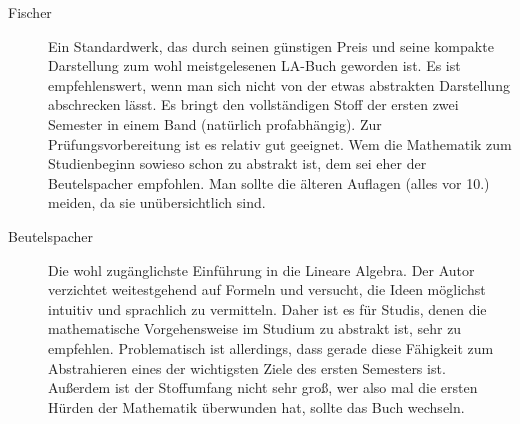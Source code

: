 \begin{description}
\item[Fischer]{
Ein Standardwerk, das durch seinen günstigen Preis und seine kompakte
Darstellung zum wohl meistgelesenen LA-Buch geworden ist. Es ist
empfehlenswert, wenn man sich nicht von der etwas abstrakten Darstellung
abschrecken lässt. Es bringt den vollständigen Stoff der ersten zwei
Semester in einem Band (natürlich profabhängig). Zur
Prüfungsvorbereitung
ist es relativ gut geeignet. Wem die Mathematik zum Studienbeginn
sowieso
schon zu abstrakt ist, dem sei eher der Beutelspacher empfohlen.
Man sollte die älteren Auflagen (alles vor 10.) meiden, da sie
unübersichtlich sind.}





\item[Beutelspacher]{
Die wohl zugänglichste Einführung in die Lineare Algebra. Der Autor
verzichtet weitestgehend auf Formeln und versucht, die Ideen möglichst
intuitiv und sprachlich zu vermitteln. Daher ist es für Studis, denen
die
mathematische Vorgehensweise im Studium zu abstrakt ist, sehr zu
empfehlen.
Problematisch ist allerdings, dass gerade diese Fähigkeit zum
Abstrahieren eines der wichtigsten Ziele des ersten Semesters ist.
Außerdem ist der Stoffumfang nicht sehr
groß, wer also mal die ersten Hürden der Mathematik überwunden hat,
sollte
das Buch wechseln.}


\end{description}
